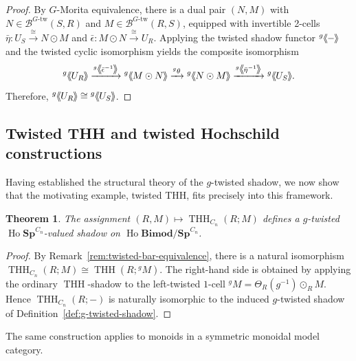 \documentclass[11pt,oneside]{amsart}
\DeclareMathOperator{\Ho}{Ho}
\DeclareMathOperator{\THH}{THH}
\numberwithin{equation}{section}
\numberwithin{figure}{section}
\theoremstyle{plain}
\newtheorem{thm}{Theorem}[section]
\theoremstyle{definition}
\theoremstyle{remark}
\newcommand{\shspace}{\hspace{.5mm}} %
\newcommand{\sh}[1]{{\ensuremath{\shspace\hspace{1mm}\makebox[-1mm]{$\langle$}\makebox[0mm]{$\langle$}\hspace{1mm}{#1}\makebox[1mm]{$\rangle$}\makebox[0mm]{$\rangle$}\shspace}}}
\begin{document}
\begin{proof}
By \(G\)-Morita equivalence, there is a dual pair \((N,M)\) with \(N\in\mathcal{B}^{G\text{-tw}}(S,R)\) and \(M\in\mathcal{B}^{G\text{-tw}}(R,S)\), equipped with invertible 2-cells \(\bar\eta\colon U_S \xrightarrow{\cong} N\odot M\) and \(\bar\epsilon\colon M\odot N \xrightarrow{\cong} U_R\). Applying the twisted shadow functor \({}^g\sh{-}\) and the twisted cyclic isomorphism yields the composite isomorphism
\[
{}^g\sh{U_R} \xrightarrow{{}^g\sh{\bar\epsilon^{-1}}} {}^g\sh{M \odot N} \xrightarrow{{}^g\theta} {}^g\sh{N \odot M} \xrightarrow{{}^g\sh{\bar\eta^{-1}}} {}^g\sh{U_S}
.\]
Therefore, \({}^g\sh{U_R}\cong {}^g\sh{U_S}\).
\end{proof}



\subsection{Twisted THH and twisted Hochschild constructions}
Having established the structural theory of the 
$g$-twisted shadow, we now show that the motivating example, twisted 
THH, fits precisely into this framework.
 

\begin{thm}\label{thm:twisted-thh-shadow}
The assignment
\(
(R,M)\mapsto\THH_{C_n}(R;M)
\)
defines a \(g\)-twisted
\(\Ho\mathbf{Sp}^{C_n}\)-valued shadow on
\(\Ho\mathbf{Bimod}/\mathbf{Sp}^{C_n}\).
\end{thm}

 

\begin{proof}
By Remark~\ref{rem:twisted-bar-equivalence}, there is a natural
isomorphism
\(
\THH_{C_n}(R;M)
\cong
\THH(R;{}^gM).
\) The right-hand side is obtained by applying the ordinary
\(\THH\)-shadow to the left-twisted \(1\)-cell
\({}^gM=\Theta_R(g^{-1})\odot_R M\). Hence
\(\THH_{C_n}(R;-)\) is naturally isomorphic to the induced
\(g\)-twisted shadow of Definition~\ref{def:g-twisted-shadow}.
\end{proof}


The same construction applies to monoids in a symmetric monoidal model category.  
\end{document}
